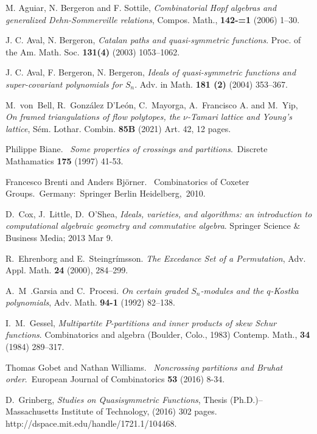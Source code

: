 \documentclass[12pt]{amsart}
\theoremstyle{definition}
\theoremstyle{remark}
\numberwithin{equation}{section}
\begin{document}
\begin{thebibliography}{99}

 M. Aguiar, N. Bergeron and F. Sottile,
\textit{Combinatorial {H}opf algebras and generalized
              {D}ehn-{S}ommerville relations},
{Compos. Math.},
 {\bf 142-=1} (2006) 1--30.


 J. C. Aval, N. Bergeron,
\textit{Catalan paths and quasi-symmetric functions}.
Proc. of the Am. Math. Soc. {\bf 131(4)} (2003) 1053--1062.

 J. C. Aval, F. Bergeron, N. Bergeron,
\textit{Ideals of quasi-symmetric functions and super-covariant polynomials for $S_n$}.
Adv. in Math. {\bf 181 (2)} (2004) 353--367.

M.~von~Bell, R.~Gonz\'{a}lez D'Le\'{o}n, C.~Mayorga, A.~Francisco A. and M.~Yip,
\textit {On framed triangulations of flow polytopes, the {$\nu$}-{T}amari lattice and {Y}oung's lattice},
{S\'{e}m. Lothar. Combin.} {\bf 85B}
(2021) Art. 42, 12 pages.

  Philippe Biane.  \textit{Some properties of crossings and partitions}. Discrete Mathamatics {\bf 175} (1997) 41-53.

  Francesco Brenti and Anders Bj\"{o}rner.  Combinatorics of Coxeter Groups. Germany: Springer Berlin Heidelberg, 2010.


 D.~Cox, J.~Little, D.~O'Shea,
\textit{Ideals, varieties, and algorithms: an introduction to computational
algebraic geometry and commutative algebra}.
Springer Science \& Business Media; 2013 Mar 9.

 R.~Ehrenborg and E.~Steingr\'{i}msson.
\textit{The Excedance Set of a Permutation},
{Adv. Appl. Math.}
{\bf 24} (2000), 284--299.

 A.~M~.Garsia and C.~Procesi.
\textit{On certain graded {$S_n$}-modules and the {$q$}-{K}ostka
              polynomials},
 {Adv. Math.}
 {\bf 94-1} (1992)  82--138.
 
 I.~M.~Gessel,
\textit{Multipartite {$P$}-partitions and inner products of skew
              {S}chur functions}.
{Combinatorics and algebra ({B}oulder, {C}olo., 1983)} 
{Contemp. Math.}, {\bf 34} (1984)
    289--317.
    
    
  Thomas Gobet and Nathan Williams.  \textit{Noncrossing partitions and Bruhat order}. European Journal of Combinatorics {\bf 53} (2016) 8-34.

 D.~Grinberg, 
 \textit{Studies on {Q}uasisymmetric {F}unctions},
{Thesis (Ph.D.)--Massachusetts Institute of Technology},
 (2016) 302 pages.
http://dspace.mit.edu/handle/1721.1/104468.


\end{thebibliography}
\end{document}
